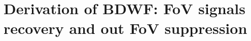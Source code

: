 \documentclass[useAMS,usenatbib]{mn2e}
\begin{document}
\section{Derivation of BDWF: FoV signals recovery and out FoV suppression}
\label{baseline2}
\end{document}
